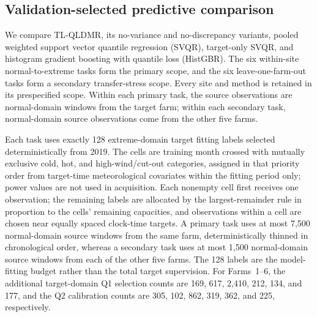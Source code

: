 
\subsection{Validation-selected predictive comparison}\label{sec:selection}
{\color{blue}We compare TL-QLDMR, its no-variance and no-discrepancy variants, pooled weighted support vector quantile regression (SVQR), target-only SVQR, and histogram gradient boosting with quantile loss (HistGBR). The six within-site normal-to-extreme tasks form the primary scope, and the six leave-one-farm-out tasks form a secondary transfer-stress scope. Every site and method is retained in its prespecified scope. Within each primary task, the source observations are normal-domain windows from the target farm; within each secondary task, normal-domain source observations come from the other five farms.}

{\color{blue}Each task uses exactly 128 extreme-domain target fitting labels selected deterministically from 2019. The cells are training month crossed with mutually exclusive cold, hot, and high-wind/cut-out categories, assigned in that priority order from target-time meteorological covariates within the fitting period only; power values are not used in acquisition. Each nonempty cell first receives one observation; the remaining labels are allocated by the largest-remainder rule in proportion to the cells' remaining capacities, and observations within a cell are chosen near equally spaced clock-time targets. A primary task uses at most 7,500 normal-domain source windows from the same farm, deterministically thinned in chronological order, whereas a secondary task uses at most 1,500 normal-domain source windows from each of the other five farms. The 128 labels are the model-fitting budget rather than the total target supervision. For Farms~1--6, the additional target-domain Q1 selection counts are 169, 617, 2,410, 212, 134, and 177, and the Q2 calibration counts are 305, 102, 862, 319, 362, and 225, respectively.}

